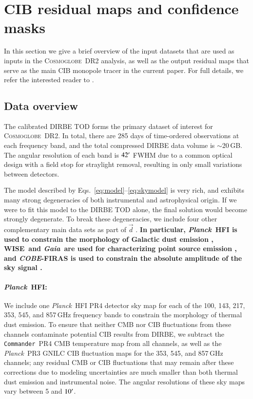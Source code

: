 \documentclass{aa}
\def\commander{\texttt{Commander}}
\def\Planck{\textit{Planck}}
\def\planck{\textit{Planck}}
\def\Gaia{\textit{Gaia}}
\newcommand{\dv}[0]{\vec{d}}
\newcommand{\cosmoglobe}{\textsc{Cosmoglobe}}
\def\commander{\texttt{Commander}}
\def\Planck{\textit{Planck}}
\def\COBE{\textit{COBE}}
\def\Gaia{\textit{Gaia}}
\def\WISE{WISE}
\begin{document}
\section{CIB residual maps and confidence masks}
\label{sec:data}

In this section we give a brief overview of the input datasets that
are used as inputs in the \cosmoglobe\ DR2 analysis, as well as the
output residual maps that serve as the main CIB monopole tracer in the
current paper. 
For full details, we refer the interested reader to
\citet{CG02_01}. 

\subsection{Data overview}
\label{sec:datasummary}

The calibrated DIRBE TOD forms the primary dataset of interest for
\cosmoglobe\ DR2. In total, there are 285 days of time-ordered
observations at each frequency band, and the total compressed DIRBE
data volume is $\sim$20\,GB. The angular resolution of each band is
$42\arcm$ FWHM due to a common optical design with a field stop for straylight removal, resulting in  only small variations between detectors.

The model described by
Eqs.~\eqref{eq:model}--\eqref{eq:skymodel} is very rich, and exhibits
many strong degeneracies of both instrumental and astrophysical
origin. If we were to fit this model to the DIRBE TOD alone, the final
solution would become strongly degenerate. To break these
degeneracies, we include four other complementary main data sets as
part of $\dv$ \citep{CG02_01}. 
\textbf{In particular, \planck\ HFI is used to constrain the morphology of Galactic dust emission \citep{CG02_05,CG02_06,CG02_07}, \WISE\ and \Gaia\ are used for characterizing point source emission \citep{CG02_04}, and \COBE-FIRAS is used to constrain the absolute amplitude of the sky signal \citep{CG02_01}.}


\paragraph{\Planck\ HFI:} We include one \Planck\ HFI PR4 \citep{npipe} detector sky map for each of the 100, 143, 217,
  353, 545, and 857\,GHz frequency bands to constrain the morphology
  of thermal dust emission. To ensure that neither CMB nor CIB
  fluctuations from these channels contaminate potential CIB results
  from DIRBE, we subtract the \commander\ PR4 CMB temperature map
  from all channels, as well as the \Planck\ PR3 GNILC
  CIB fluctuation maps \citep{gnilc_cib} for the 353, 545, and 857\,GHz channels; any
  residual CMB or CIB fluctuations that may remain after these
  corrections due to modeling uncertainties are much smaller than
  both thermal dust emission and instrumental noise. The angular
  resolutions of these sky maps vary between 5 and $10\arcm$.
\end{document}
